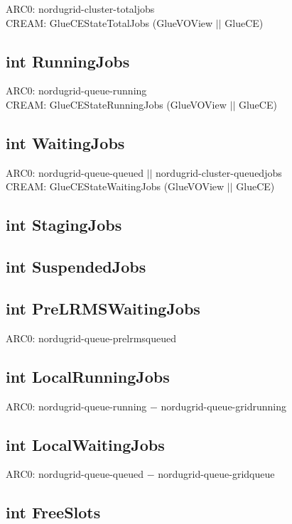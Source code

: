 \documentclass{book}
\begin{document}
ARC0: nordugrid-cluster-totaljobs \\
CREAM: GlueCEStateTotalJobs (GlueVOView $||$ GlueCE)

\subsection*{int RunningJobs}

ARC0: nordugrid-queue-running \\
CREAM: GlueCEStateRunningJobs (GlueVOView $||$ GlueCE)

\subsection*{int WaitingJobs}

ARC0: nordugrid-queue-queued $||$ nordugrid-cluster-queuedjobs \\
CREAM: GlueCEStateWaitingJobs (GlueVOView $||$ GlueCE)

\subsection*{int StagingJobs}

\subsection*{int SuspendedJobs}

\subsection*{int PreLRMSWaitingJobs}

ARC0: nordugrid-queue-prelrmsqueued

\subsection*{int LocalRunningJobs}

ARC0: nordugrid-queue-running $-$ nordugrid-queue-gridrunning

\subsection*{int LocalWaitingJobs}

ARC0: nordugrid-queue-queued $-$ nordugrid-queue-gridqueue

\subsection*{int FreeSlots}
\end{document}
